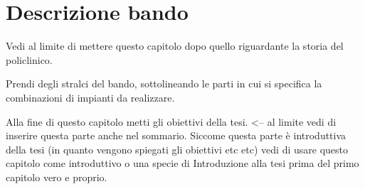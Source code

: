 \chapter{Descrizione bando}
\thispagestyle{empty}
Vedi al limite di mettere questo capitolo dopo quello riguardante la storia del policlinico.

Prendi degli stralci del bando, sottolineando le parti in cui si specifica la combinazioni di impianti da realizzare. 

Alla fine di questo capitolo metti gli obiettivi della tesi. <-- al limite vedi di inserire questa parte anche nel sommario. Siccome questa parte è introduttiva della tesi (in quanto vengono spiegati gli obiettivi etc etc) vedi di usare questo capitolo come introduttivo o una specie di Introduzione alla tesi prima del primo capitolo vero e proprio.
